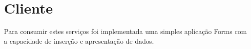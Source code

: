\section{Cliente}

Para consumir estes serviços foi implementada uma simples aplicação Forms com a capacidade de inserção e apresentação de dados.